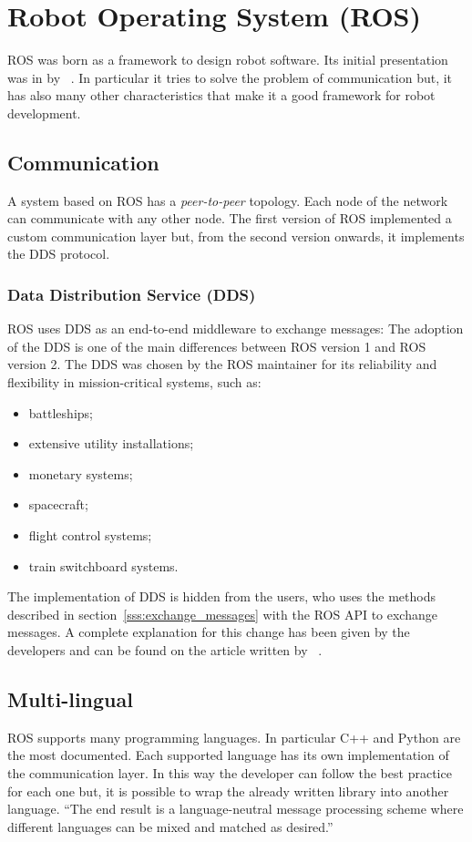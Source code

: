 \documentclass[../thesis.tex]{subfiles}
\begin{document}
\section{Robot Operating System (ROS)}
\acrshort{ROS} was born as a framework to design robot software. Its initial presentation was in \citeyear{paper:ros} by \citeauthor{paper:ros}~\cite{paper:ros}. In particular it tries to solve the problem of communication but, it has also many other characteristics that make it a good framework for robot development.
\subsection{Communication}
A system based on \acrshort{ROS} has a \textit{peer-to-peer} topology. Each node of the network can communicate with any other node. The first version of \acrshort{ROS} implemented a custom communication layer but, from the second version onwards, it implements the \gls{DDS} protocol.
\subsubsection{Data Distribution Service (DDS)}
\gls{ROS} uses \gls{DDS} as an end-to-end middleware to exchange messages: The adoption of the \gls{DDS} is one of the main differences between \gls{ROS} version 1 and \gls{ROS} version 2. The \gls{DDS} was chosen by the \gls{ROS} maintainer for its reliability and flexibility in mission-critical systems, such as:
\begin{itemize}
    \item battleships;
    \item extensive utility installations;
    \item monetary systems;
    \item spacecraft;
    \item flight control systems;
    \item train switchboard systems.
\end{itemize}
The implementation of \gls{DDS} is hidden from the users, who uses the methods described in section~\ref{sss:exchange_messages} with the \gls{ROS} API to exchange messages. A complete explanation for this change has been given by the developers and can be found on the article written by \citeauthor{site:ros_dds}~\cite{site:ros_dds}.

\subsection{Multi-lingual}
\gls{ROS} supports many programming languages. In particular C++ and Python are the most documented. Each supported language has its own implementation of the communication layer. In this way the developer can follow the best practice for each one but, it is possible to wrap the already written library into another language. ``The end result is a language-neutral message processing scheme where different languages can be mixed and matched as desired.''~\cite{paper:ros}
\end{document}
